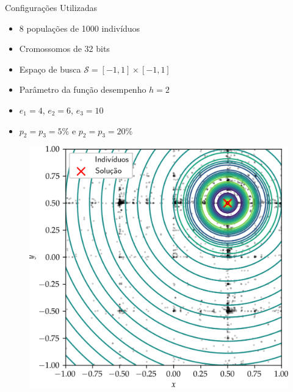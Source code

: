 \begin{frame}
  \begin{block}{Configurações Utilizadas}
    \begin{itemize}
      \item 8 populações de 1000 indivíduos
      \item Cromossomos de 32 bits
      \item Espaço de busca $\mathcal{S} = [-1,1] \times [-1,1]$
      \item Parâmetro da função desempenho $h = 2$
      \item $e_1 = 4$, $e_2 = 6$, $e_3 = 10$
      \item $p_2 = p_3 = 5\%$ e $p_2 = p_3 = 20\%$
    \end{itemize}
  \end{block}
\end{frame}

\begin{frame}
  \begin{figure}
    \centering
    \includegraphics[height=0.95\textheight]{imagens/low_prob/contour_damped_cossine.png}
  \end{figure}
\end{frame}

